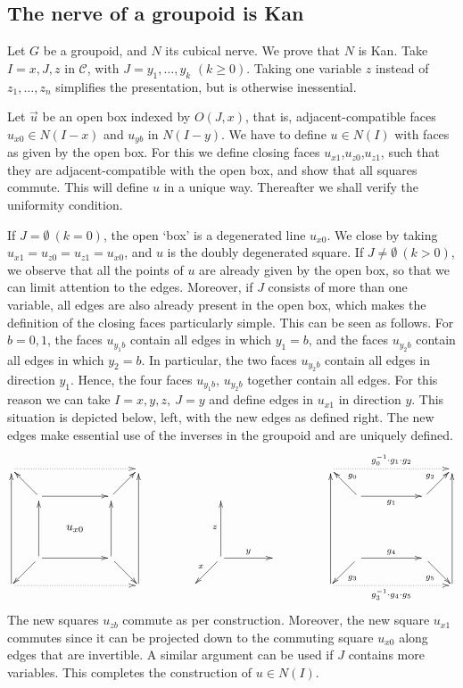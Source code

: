 \documentclass[10pt,a4paper]{article}
\newcommand{\CC}{{\mathcal C}}
\begin{document}
\subsection{The nerve of a groupoid is Kan}\label{sec:groupoidnerve}
Let $G$ be a groupoid, and $N$ its cubical nerve.
We prove that $N$ is Kan. Take $I=x,J,z$ in $\CC$,
with $J=y_1,\ldots,y_k$ $(k\geq 0)$. Taking one variable $z$ instead of
$z_1,\ldots,z_n$ simplifies the presentation, but is otherwise inessential.

Let $\vec u$ be an open box indexed by $O(J,x)$, that is,
adjacent-compatible faces $u_{x0}\in N(I-x)$ and $u_{yb}$ in $N(I-y)$.
We have to define $u\in N(I)$ with faces as given by the open box.
For this we define closing faces $u_{x1}$,$u_{z0}$,$u_{z1}$, such that they
are adjacent-compatible with the open box, and show that all squares
commute. This will define $u$ in a unique way.
Thereafter we shall verify the uniformity condition.

If $J=\emptyset~(k=0)$,  the open `box' is a degenerated line $u_{x0}$.
We close by taking $u_{x1}=u_{z0}=u_{z1}=u_{x0}$, and $u$ is the
doubly degenerated square. If $J\neq\emptyset~(k>0)$,
we observe that all the points of $u$ are already given by the open
box, so that we can limit attention to the edges.
Moreover, if $J$ consists of more than one variable, all edges are also
already present in the open box, which makes the definition of the closing faces
particularly simple. This can be seen as follows.
For $b=0,1$, the faces $u_{y_1b}$ contain all edges in which $y_1 = b$,
and the faces $u_{y_2b}$ contain all edges in which $y_2 = b$.
In particular, the two faces $u_{y_2b}$ contain all edges in direction $y_1$.
Hence, the four faces $u_{y_1b}$, $u_{y_2b}$ together contain all edges.
For this reason we can take $I=x,y,z,~J=y$ and define edges in $u_{x1}$ in direction $y$.
This situation is depicted below, left, with the new edges as defined right.
The new edges make essential use of the inverses in the groupoid
and are uniquely defined.
\[
\xymatrix@R=.6cm@C=.6cm{
\ar@{.>}[rrrr]            &&&&         &
&&&&&         &
\ar@{.>}[rrrr]^{g_0^{-1}\cdot g_1\cdot g_2}           &&&&         \\
&\ar[lu]\ar[rr]        &&  \ar[ru]&   &
&&&&&   &
&\ar[lu]_{g_0} \ar[rr]_{g_1}         &&  \ar[ru]^{g_2} &   \\
&&u_{x0}&&                               &
&&&&&                               &
&&~~~&&                               \\
&\ar[ld]\ar[rr]\ar[uu]&&\ar[rd]\ar[uu]& &
&&\ar[ld]_x\ar[rr]^{y}\ar[uu]^z&&& &
&\ar[ld]^{g_3}\ar[rr]^{g_4}&&\ar[rd]_{g_5} & \\
\ar[uuuu]\ar@{.>}[rrrr]&&&&\ar[uuuu] &
&&&&&  &
\ar[uuuu]\ar@{.>}[rrrr]_{g_3^{-1}\cdot g_4\cdot g_5}&&&&\ar[uuuu]\\
}
\]
The new squares $u_{zb}$ commute as per construction.
Moreover, the new square $u_{x1}$ commutes since it can
be projected down to the commuting square $u_{x0}$
along edges that are invertible.
A similar argument can be used if $J$ contains more variables.
This completes the construction of $u\in N(I)$.
\end{document}
